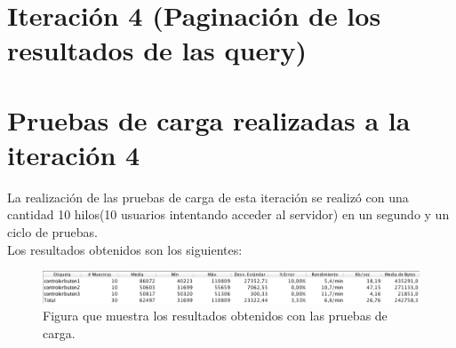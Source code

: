 \section{Iteración 4 (Paginación de los resultados de las query)}  

\section{Pruebas de carga realizadas a la iteración 4}

La realización de las pruebas de carga de esta iteración se realizó con una cantidad 10 hilos(10 usuarios intentando acceder al servidor)
en un segundo y un ciclo de pruebas.\\

Los resultados obtenidos son los siguientes:

\begin{figure}[htb]
	\label{Figura14}
	\begin{center}
		\includegraphics[scale=0.7]{imagenes/iteracion3-cacheCodeIgniter.png}
		\caption{Figura que muestra los resultados obtenidos con las pruebas de carga.}
	\end{center}
\end{figure}


